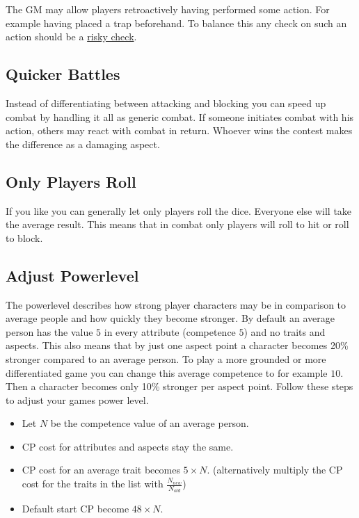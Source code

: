 \documentclass[11pt]{article}
\begin{document}
{The GM may allow players retroactively having performed some action. For example having placed a trap beforehand. To balance this any check on such an action should be a \hyperref[sec:orgba75c45]{risky check}.
\subsection{Quicker Battles}
\label{sec:org3b37f92}

Instead of differentiating between attacking and blocking you can speed up combat by handling it all as generic combat. If someone initiates combat with his action, others may react with combat in return. Whoever wins the contest makes the difference as a damaging aspect.
\subsection{Only Players Roll}
\label{sec:org46682e5}
If you like you can generally let only players roll the dice. Everyone else will take the average result. This means that in combat only players will roll to hit or roll to block.
\subsection{Adjust Powerlevel}
\label{sec:orge886b89}

The powerlevel describes how strong player characters may be in comparison to average people and how quickly they become stronger. By default an average person has the value \(5\) in every attribute (competence \(5\)) and no traits and aspects. This also means that by just one aspect point a character becomes 20\% stronger compared to an average person. To play a more grounded or more differentiated game you can change this average competence to for example \(10\). Then a character becomes only 10\% stronger per aspect point. Follow these steps to adjust your games power level.

\begin{itemize}
\item Let \(N\) be the competence value of an average person.
\item CP cost for attributes and aspects stay the same.
\item CP cost for an average trait becomes \(5 \times N\). (alternatively multiply the CP cost for the traits in the list with \(\frac{N_{new}}{N_{old}}\))
\item Default start CP become \(48 \times N\).
\end{itemize}

}
\end{document}
